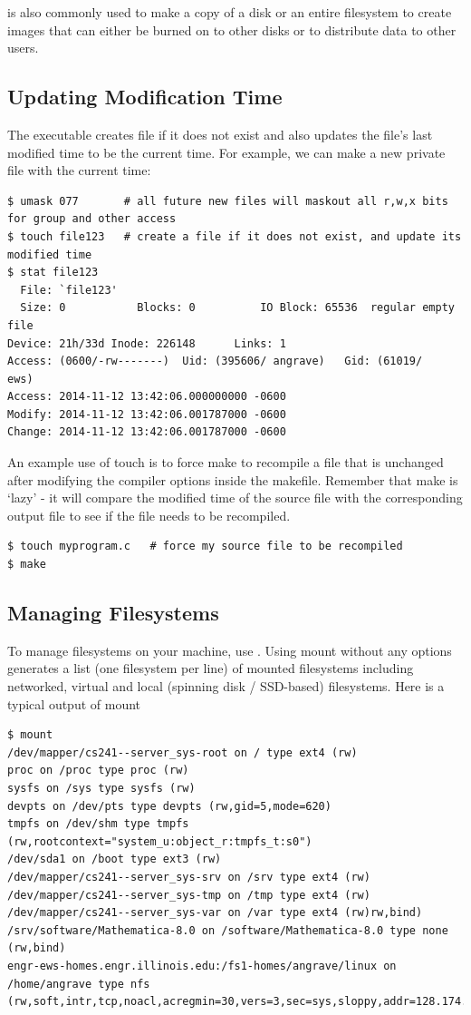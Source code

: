  is also commonly used to make a copy of a disk or an entire filesystem to create images that can either be burned on to other disks or to distribute data to other users.

\subsection{Updating Modification Time}

The  executable creates file if it does not exist and also updates the file's last modified time to be the current time. For example, we can make a new private file with the current time:

\begin{verbatim}
$ umask 077       # all future new files will maskout all r,w,x bits for group and other access
$ touch file123   # create a file if it does not exist, and update its modified time
$ stat file123
  File: `file123'
  Size: 0           Blocks: 0          IO Block: 65536  regular empty file
Device: 21h/33d Inode: 226148      Links: 1
Access: (0600/-rw-------)  Uid: (395606/ angrave)   Gid: (61019/     ews)
Access: 2014-11-12 13:42:06.000000000 -0600
Modify: 2014-11-12 13:42:06.001787000 -0600
Change: 2014-11-12 13:42:06.001787000 -0600
\end{verbatim}

An example use of touch is to force make to recompile a file that is unchanged after modifying the compiler options inside the makefile.
Remember that make is `lazy' - it will compare the modified time of the source file with the corresponding output file to see if the file needs to be recompiled.

\begin{verbatim}
$ touch myprogram.c   # force my source file to be recompiled
$ make
\end{verbatim}

\subsection{Managing Filesystems}

To manage filesystems on your machine, use .
Using mount without any options generates a list (one filesystem per line) of mounted filesystems including networked, virtual and local (spinning disk / SSD-based) filesystems.
Here is a typical output of mount

\begin{verbatim}
$ mount
/dev/mapper/cs241--server_sys-root on / type ext4 (rw)
proc on /proc type proc (rw)
sysfs on /sys type sysfs (rw)
devpts on /dev/pts type devpts (rw,gid=5,mode=620)
tmpfs on /dev/shm type tmpfs (rw,rootcontext="system_u:object_r:tmpfs_t:s0")
/dev/sda1 on /boot type ext3 (rw)
/dev/mapper/cs241--server_sys-srv on /srv type ext4 (rw)
/dev/mapper/cs241--server_sys-tmp on /tmp type ext4 (rw)
/dev/mapper/cs241--server_sys-var on /var type ext4 (rw)rw,bind)
/srv/software/Mathematica-8.0 on /software/Mathematica-8.0 type none (rw,bind)
engr-ews-homes.engr.illinois.edu:/fs1-homes/angrave/linux on /home/angrave type nfs (rw,soft,intr,tcp,noacl,acregmin=30,vers=3,sec=sys,sloppy,addr=128.174.252.102)
\end{verbatim}

